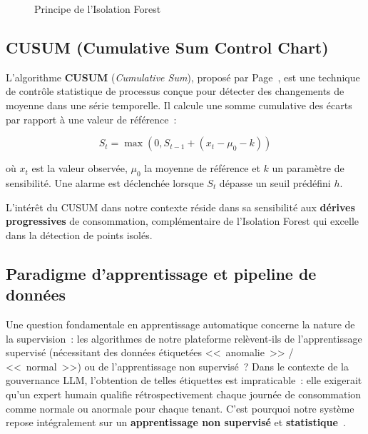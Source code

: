 \begin{figure}[H]
    \centering
    \caption{Principe de l'Isolation Forest~\cite{liu2008}}
    \label{fig:isolation_forest}
\end{figure}

\subsection{CUSUM (Cumulative Sum Control Chart)}

L'algorithme \textbf{CUSUM} (\textit{Cumulative Sum}), proposé par Page~\cite{page1954}, est une technique de contrôle statistique de processus conçue pour détecter des changements de moyenne dans une série temporelle. Il calcule une somme cumulative des écarts par rapport à une valeur de référence~:

\begin{equation}
S_t = \max(0, S_{t-1} + (x_t - \mu_0 - k))
\end{equation}

\noindent où $x_t$ est la valeur observée, $\mu_0$ la moyenne de référence et $k$ un paramètre de sensibilité. Une alarme est déclenchée lorsque $S_t$ dépasse un seuil prédéfini $h$.

L'intérêt du CUSUM dans notre contexte réside dans sa sensibilité aux \textbf{dérives progressives} de consommation, complémentaire de l'Isolation Forest qui excelle dans la détection de points isolés.

\subsection{Paradigme d'apprentissage et pipeline de données}

Une question fondamentale en apprentissage automatique concerne la nature de la supervision~: les algorithmes de notre plateforme relèvent-ils de l'apprentissage supervisé (nécessitant des données étiquetées <<~anomalie~>> / <<~normal~>>) ou de l'apprentissage non supervisé~? Dans le contexte de la gouvernance LLM, l'obtention de telles étiquettes est impraticable~: elle exigerait qu'un expert humain qualifie rétrospectivement chaque journée de consommation comme normale ou anormale pour chaque tenant. C'est pourquoi notre système repose intégralement sur un \textbf{apprentissage non supervisé} et \textbf{statistique}~\cite{chandola2009}.

